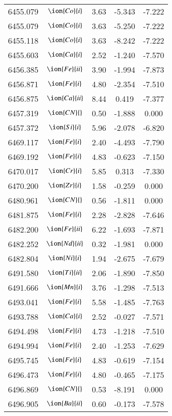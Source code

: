 \documentclass[fleqn,usenatbib]{mnras}
\begin{document}
\begin{center}
\begin{table}
\begin{tabular}{ccccc}
6455.079 &  $\ion{Co}{i}$  & 3.63 & -5.343 & -7.222 \\ 
6455.079 &  $\ion{Co}{i}$  & 3.63 & -5.250 & -7.222 \\ 
6455.118 &  $\ion{Co}{i}$  & 3.63 & -8.242 & -7.222 \\ 
6455.603 &  $\ion{Ca}{i}$  & 2.52 & -1.240 & -7.570 \\ 
6456.385 &  $\ion{Fe}{ii}$  & 3.90 & -1.994 & -7.873 \\ 
6456.871 &  $\ion{Fe}{i}$  & 4.80 & -2.354 & -7.510 \\ 
6456.875 &  $\ion{Ca}{ii}$  & 8.44 & 0.419 & -7.377 \\ 
6457.319 & $\ion{CN}{}$ & 0.50 & -1.888 & 0.000 \\ 
6457.372 &  $\ion{Si}{i}$  & 5.96 & -2.078 & -6.820 \\ 
6469.117 &  $\ion{Fe}{i}$  & 2.40 & -4.493 & -7.790 \\ 
6469.192 &  $\ion{Fe}{i}$  & 4.83 & -0.623 & -7.150 \\ 
6470.017 &  $\ion{Cr}{i}$  & 5.85 & 0.313 & -7.330 \\ 
6470.200 &  $\ion{Zr}{i}$  & 1.58 & -0.259 & 0.000 \\ 
6480.961 & $\ion{CN}{}$ & 0.56 & -1.811 & 0.000 \\ 
6481.875 &  $\ion{Fe}{i}$  & 2.28 & -2.828 & -7.646 \\ 
6482.200 &  $\ion{Fe}{ii}$  & 6.22 & -1.693 & -7.871 \\ 
6482.252 &  $\ion{Nd}{ii}$  & 0.32 & -1.981 & 0.000 \\ 
6482.804 &  $\ion{Ni}{i}$  & 1.94 & -2.675 & -7.679 \\ 
6491.580 &  $\ion{Ti}{ii}$  & 2.06 & -1.890 & -7.850 \\ 
6491.666 &  $\ion{Mn}{i}$  & 3.76 & -1.298 & -7.513 \\ 
6493.041 &  $\ion{Fe}{i}$  & 5.58 & -1.485 & -7.763 \\ 
6493.788 &  $\ion{Ca}{i}$  & 2.52 & -0.027 & -7.571 \\ 
6494.498 &  $\ion{Fe}{i}$  & 4.73 & -1.218 & -7.510 \\ 
6494.994 &  $\ion{Fe}{i}$  & 2.40 & -1.253 & -7.629 \\ 
6495.745 &  $\ion{Fe}{i}$  & 4.83 & -0.619 & -7.154 \\ 
6496.473 &  $\ion{Fe}{i}$  & 4.80 & -0.465 & -7.175 \\ 
6496.869 & $\ion{CN}{}$ & 0.53 & -8.191 & 0.000 \\ 
6496.905 &  $\ion{Ba}{ii}$  & 0.60 & -0.173 & -7.578 \\ 

\end{tabular}
\end{table}
\end{center}
\end{document}
